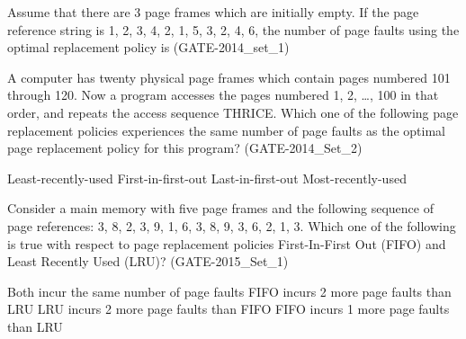 
\begin{questyle}

  \question Assume that there are 3 page frames which are initially empty. If the page reference
            string is 1, 2, 3, 4, 2, 1, 5, 3, 2, 4, 6, the number of page faults using the optimal
            replacement policy is \fillin[7] (GATE-2014\_set\_1)

\end{questyle}



\begin{questyle}

  \question  A computer has twenty physical page frames which contain pages numbered 101 through 120.
            Now a program accesses the pages numbered 1, 2, …, 100 in that order, and repeats the access sequence
            THRICE. Which one of the following page replacement policies experiences the same number of
            page faults as the optimal page replacement policy for this program? (GATE-2014\_Set\_2)

  \begin{choices}
    \choice Least-recently-used
    \choice First-in-first-out
    \choice Last-in-first-out
    \correctchoice Most-recently-used
  \end{choices}

\end{questyle}


\begin{questyle}

  \question  Consider a main memory with five page frames and the following sequence of page
             references: 3, 8, 2, 3, 9, 1, 6, 3, 8, 9, 3, 6, 2, 1, 3. Which one of the following is true with respect
             to page replacement policies First-In-First Out (FIFO) and Least Recently Used (LRU)? (GATE-2015\_Set\_1)

  \begin{choices}
    \correctchoice Both incur the same number of page faults
    \choice FIFO incurs 2 more page faults than LRU
    \choice LRU incurs 2 more page faults than FIFO
    \choice FIFO incurs 1 more page faults than LRU
  \end{choices}

\end{questyle}


